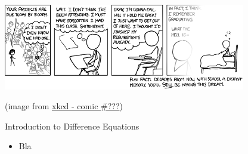 %
%


\begin{topic}[Projects]


\vfil

\begin{center}
\begin{minipage}{300pt}
	\includegraphics*[width=300pt]{images/chap6-xkcd.png}

	\hfill {\footnotesize (image from \href{https://www.xkcd.com/???/}{xkcd - comic \#???})}
\end{minipage}
\end{center}
\end{topic}











%
%



\begin{module}{Introduction to Difference Equations}
	\label{diff:intro}

	
%	
\end{module}



\begin{lesson}

	\begin{itemize}
		\item Bla
	\end{itemize}
	

\end{lesson}


%
%
%
%
%
%
%
%






